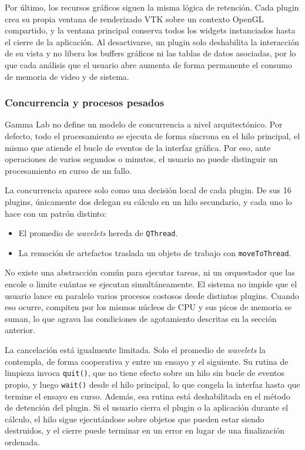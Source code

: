 \documentclass[11pt,a4paper]{article}
\DeclareRobustCommand{\_}{\textunderscore\allowbreak}
\begin{document}
Por último, los recursos gráficos siguen la misma lógica de retención. Cada plugin crea su propia ventana de renderizado VTK sobre un contexto OpenGL compartido, y la ventana principal conserva todos los widgets instanciados hasta el cierre de la aplicación. Al desactivarse, un plugin solo deshabilita la interacción de su vista y no libera los buffers gráficos ni las tablas de datos asociadas, por lo que cada análisis que el usuario abre aumenta de forma permanente el consumo de memoria de video y de sistema.

\subsubsection{Concurrencia y procesos pesados}
\label{sec:diag_concurrencia}

Gamma Lab no define un modelo de concurrencia a nivel arquitectónico. Por defecto, todo el procesamiento se ejecuta de forma síncrona en el hilo principal, el mismo que atiende el bucle de eventos de la interfaz gráfica. Por eso, ante operaciones de varios segundos o minutos, el usuario no puede distinguir un procesamiento en curso de un fallo.

La concurrencia aparece solo como una decisión local de cada plugin. De sus 16 plugins, únicamente dos delegan su cálculo en un hilo secundario, y cada uno lo hace con un patrón distinto:

\begin{itemize}
    \item El promedio de \textit{wavelets} hereda de \texttt{QThread}.
    
    \item La remoción de artefactos traslada un objeto de trabajo con \texttt{moveToThread}.
\end{itemize}

No existe una abstracción común para ejecutar tareas, ni un orquestador que las encole o limite cuántas se ejecutan simultáneamente. El sistema no impide que el usuario lance en paralelo varios procesos costosos desde distintos plugins. Cuando eso ocurre, compiten por los mismos núcleos de CPU y sus picos de memoria se suman, lo que agrava las condiciones de agotamiento descritas en la sección anterior.

La cancelación está igualmente limitada. Solo el promedio de \textit{wavelets} la contempla, de forma cooperativa y entre un ensayo y el siguiente. Su rutina de limpieza invoca \texttt{quit()}, que no tiene efecto sobre un hilo sin bucle de eventos propio, y luego \texttt{wait()} desde el hilo principal, lo que congela la interfaz hasta que termine el ensayo en curso. Además, esa rutina está deshabilitada en el método de detención del plugin. Si el usuario cierra el plugin o la aplicación durante el cálculo, el hilo sigue ejecutándose sobre objetos que pueden estar siendo destruidos, y el cierre puede terminar en un error en lugar de una finalización ordenada.
\end{document}
